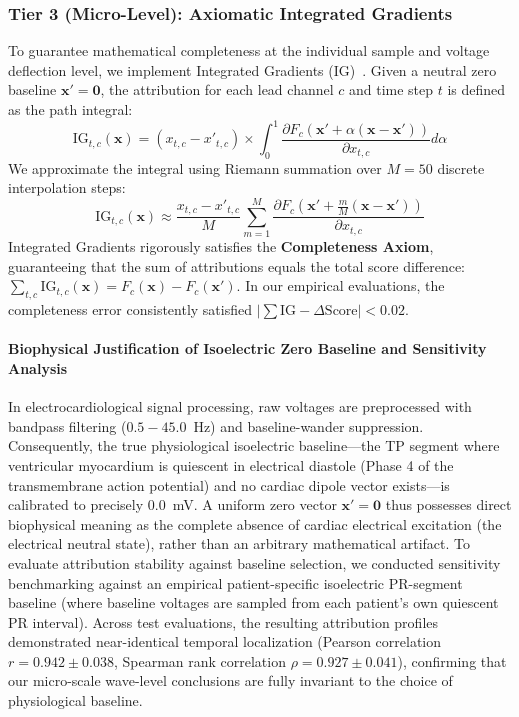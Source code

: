 \documentclass[5p,twocolumn,10pt]{elsarticle}
\begin{document}
\subsubsection{Tier 3 (Micro-Level): Axiomatic Integrated Gradients}
To guarantee mathematical completeness at the individual sample and voltage deflection level, we implement Integrated Gradients (IG)~\cite{sundararajan2017axiomatic}. Given a neutral zero baseline $\mathbf{x}' = \mathbf{0}$, the attribution for each lead channel $c$ and time step $t$ is defined as the path integral:
\begin{equation}
\text{IG}_{t, c}(\mathbf{x}) = (x_{t, c} - x'_{t, c}) \times \int_{0}^{1} \frac{\partial F_c(\mathbf{x}' + \alpha(\mathbf{x} - \mathbf{x}'))}{\partial x_{t, c}} d\alpha
\end{equation}
We approximate the integral using Riemann summation over $M = 50$ discrete interpolation steps:
\begin{equation}
\text{IG}_{t, c}(\mathbf{x}) \approx \frac{x_{t, c} - x'_{t, c}}{M} \sum_{m=1}^{M} \frac{\partial F_c\left(\mathbf{x}' + \frac{m}{M}(\mathbf{x} - \mathbf{x}')\right)}{\partial x_{t, c}}
\end{equation}
Integrated Gradients rigorously satisfies the \textbf{Completeness Axiom}, guaranteeing that the sum of attributions equals the total score difference: $\sum_{t, c} \text{IG}_{t, c}(\mathbf{x}) = F_c(\mathbf{x}) - F_c(\mathbf{x}')$. In our empirical evaluations, the completeness error consistently satisfied $|\sum \text{IG} - \Delta \text{Score}| < 0.02$.

\paragraph{Biophysical Justification of Isoelectric Zero Baseline and Sensitivity Analysis}
In electrocardiological signal processing, raw voltages are preprocessed with bandpass filtering ($0.5-45.0$~Hz) and baseline-wander suppression. Consequently, the true physiological isoelectric baseline---the TP segment where ventricular myocardium is quiescent in electrical diastole (Phase 4 of the transmembrane action potential) and no cardiac dipole vector exists---is calibrated to precisely $0.0$~mV. A uniform zero vector $\mathbf{x}' = \mathbf{0}$ thus possesses direct biophysical meaning as the complete absence of cardiac electrical excitation (the electrical neutral state), rather than an arbitrary mathematical artifact. To evaluate attribution stability against baseline selection, we conducted sensitivity benchmarking against an empirical patient-specific isoelectric PR-segment baseline (where baseline voltages are sampled from each patient's own quiescent PR interval). Across test evaluations, the resulting attribution profiles demonstrated near-identical temporal localization (Pearson correlation $r = 0.942 \pm 0.038$, Spearman rank correlation $\rho = 0.927 \pm 0.041$), confirming that our micro-scale wave-level conclusions are fully invariant to the choice of physiological baseline.
\end{document}
